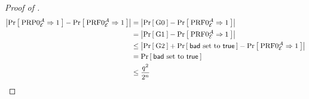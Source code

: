 \begin{proof}[Proof of ]
	 \begin{align*}
	 \left| \Prob{\PRP0_\cipher^\advA\Rightarrow 1} 
	 - \Prob{\PRF0_\cipher^\advA\Rightarrow1} \right|  
	 &=  \left|\Prob{\G0} - \Prob{\PRF0_\cipher^\advA\Rightarrow1} \right|  \\
	 &=  \left|\Prob{\G1} - \Prob{\PRF0_\cipher^\advA\Rightarrow1} \right|  \\
	 &\le \left|\Prob{\G2} + \Prob{\bad \text{ set to } \true} - \Prob{\PRF0_\cipher^\advA\Rightarrow1} \right|\\
	 &= \Prob{\bad \text{ set to } \true}\\
	 &\le \frac{q^2}{2^n} \\
	 \end{align*} 
\end{proof}